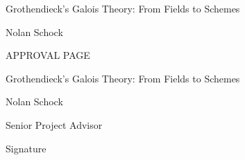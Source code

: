 \documentclass[11pt,openany]{book} %
\begin{document}

\begingroup
\thispagestyle{empty}
\centering
\vspace*{9cm}
\par\normalfont\fontsize{35}{35}\sffamily\selectfont
{Grothendieck's Galois Theory: From Fields to Schemes}\par %
\vspace*{1cm}
{\Huge Nolan Schock}\par %
\endgroup


\newpage
\thispagestyle{empty}

\begin{center}
{\Large APPROVAL PAGE}
\end{center}

\vspace{2in}
 {Grothendieck's Galois Theory: From Fields to Schemes}

\vspace{0.25in}
 Nolan Schock

\vspace{0.25in}

\vspace{3in}
\begin{minipage}{0.5\textwidth}
\underline{\hspace{2.5in}}

\noindent Senior Project Advisor
\end{minipage}
\begin{minipage}{0.5\textwidth}
\underline{\hspace{2.5in}}

\noindent Signature
\end{minipage}
\end{document}
